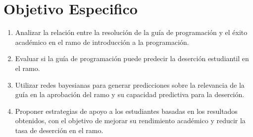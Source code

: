 \hypertarget{objetivo_especifico}{%
    \section{Objetivo Especifico}\label{Objetivo Especifico}}


    \begin{enumerate}
        \item Analizar la relación entre la resolución de la guía de programación y el éxito académico en el ramo de introducción a la programación.
        \item Evaluar si la guía de programación puede predecir la deserción estudiantil en el ramo.
        \item Utilizar redes bayesianas para generar predicciones sobre la relevancia de la guía en la aprobación del ramo y su capacidad predictiva para la deserción.
        \item Proponer estrategias de apoyo a los estudiantes basadas en los resultados obtenidos, con el objetivo de mejorar su rendimiento académico y reducir la tasa de deserción en el ramo.
      \end{enumerate}